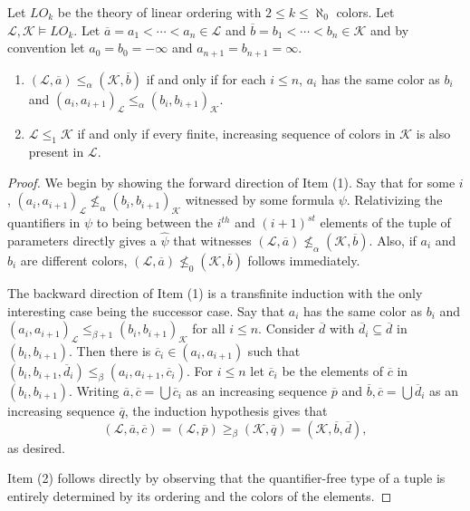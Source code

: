 \documentclass[10pt,a4paper]{amsart}
\newcommand{\mc}[1]{\mathcal{#1}}
\renewcommand{\bar}[1]{\overline{#1}}
\begin{document}
\begin{lemma}\label{lem:colorHelper}
    Let $LO_k$ be the theory of linear ordering with $2\leq k\leq\aleph_0$ colors. Let $\mc{L},\mc{K}\models LO_k$. Let $\bar{a}=a_1<\cdots<a_n\in\mc{L}$ and $\bar{b}=b_1<\cdots<b_n\in\mc{K}$ and by convention let $a_0=b_0=-\infty$ and $a_{n+1}=b_{n+1}=\infty$.
    \begin{enumerate}
        \item $(\mc{L},\bar{a})\leq_\alpha (\mc{K},\bar{b})$ if and only if for each $i\leq n$, $a_i$ has the same color as $b_i$ and $(a_i,a_{i+1})_{\mc{L}}\leq_\alpha (b_i,b_{i+1})_{\mc{K}}$.
        \item $\mc{L}\leq_1\mc{K}$ if and only if every finite, increasing sequence of colors in $\mc{K}$ is also present in $\mc{L}$.
    \end{enumerate}
    
\end{lemma}

\begin{proof}
We begin by showing the forward direction of Item (1).
Say that for some $i$, $(a_i,a_{i+1})_{\mc{L}}\not\leq_\alpha (b_i,b_{i+1})_{\mc{K}}$ witnessed by some formula $\psi$.
Relativizing the quantifiers in $\psi$ to being between the $i^{th}$ and $(i+1)^{st}$ elements of the tuple of parameters directly gives a $\hat{\psi}$ that witnesses $(\mc{L},\bar{a})\not\leq_{\alpha} (\mc{K},\bar{b})$.
Also, if $a_i$ and $b_i$ are different colors, $(\mc{L},\bar{a})\not\leq_0 (\mc{K},\bar{b})$ follows immediately.

The backward direction of Item (1) is a transfinite induction with the only interesting case being the successor case.
Say that $a_i$ has the same color as $b_i$ and $(a_i,a_{i+1})_{\mc{L}}\leq_{\beta+1} (b_i,b_{i+1})_{\mc{K}}$ for all $i\leq n$.
Consider $\bar d$ with $\bar d_i\subseteq \bar d$ in $(b_i,b_{i+1})$. Then there is $\bar c_i\in (a_i,a_{i+1})$ such that $(b_i,b_{i+1},\bar d_i)\leq_\beta ( a_i, a_{i+1},\bar c_i)$. 
For $i\leq n$ let $\bar{c}_i$ be the elements of $\bar{c}$ in $(b_i,b_{i+1})$.
Writing $\bar{a},\bar{c}=\bigcup \bar c_i$ as an increasing sequence $\bar{p}$ and $\bar{b},\bar{c}=\bigcup \bar d_i$ as an increasing sequence $\bar{q}$, the induction hypothesis gives that
\[(\mc{L},\bar{a},\bar{c})=(\mc{L},\bar{p})\geq_\beta(\mc{K},\bar{q})=(\mc{K},\bar{b},\bar{d}),\]
as desired.

Item (2) follows directly by observing that the quantifier-free type of a tuple is entirely determined by its ordering and the colors of the elements.
\end{proof}
\end{document}

